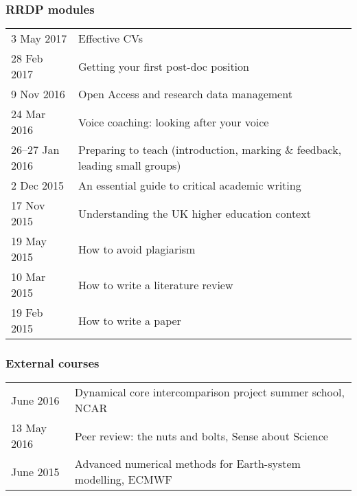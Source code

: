 \documentclass[a4paper,11pt]{article}
\begin{document}
\subsubsection*{RRDP modules}
\begin{tabular}{l l}
3 May 2017	& Effective CVs \\
28 Feb 2017	& Getting your first post-doc position \\
9 Nov 2016      & Open Access and research data management \\
24 Mar 2016	& Voice coaching: looking after your voice \\
26--27 Jan 2016 & Preparing to teach (introduction, marking \& feedback, leading small groups) \\
2 Dec 2015	& An essential guide to critical academic writing \\
17 Nov 2015	& Understanding the UK higher education context \\
19 May 2015	& How to avoid plagiarism \\
10 Mar 2015	& How to write a literature review \\
19 Feb 2015	& How to write a paper \\
\end{tabular}

\subsubsection*{External courses}
\begin{tabular}{l l}
June 2016 & Dynamical core intercomparison project summer school, NCAR \\
13 May 2016 & Peer review: the nuts and bolts, Sense about Science \\
June 2015 & Advanced numerical methods for Earth-system modelling, ECMWF \\
\end{tabular}
\end{document}
